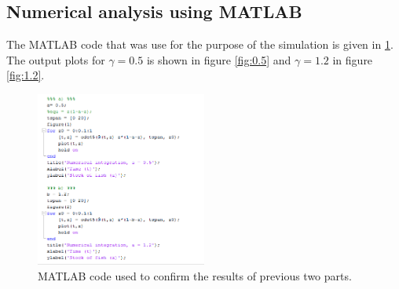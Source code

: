 \documentclass[a4paper]{article}
\begin{document}
\subsection{Numerical analysis using MATLAB}
The MATLAB code that was use for the purpose of the simulation is given in \ref{fig:code}. The output plots for \(\gamma = 0.5\) is shown in figure \ref{fig:0.5} and \(\gamma = 1.2\) in figure \ref{fig:1.2}. 
\begin{figure}
\centering
\includegraphics[width=0.5\textwidth]{code_image.PNG}
\caption{\label{fig:code}MATLAB code used to confirm the results of previous two parts.}
\end{figure}
\end{document}
